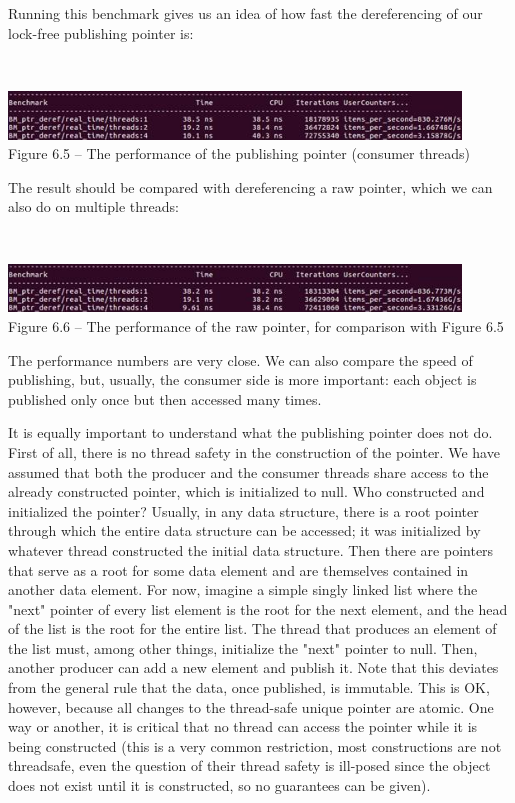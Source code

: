 Running this benchmark gives us an idea of how fast the dereferencing of our lock-free publishing pointer is:

\hspace*{\fill} \\ %
\begin{center}
\includegraphics[width=0.9\textwidth]{content/2/chapter6/images/5.jpg}\\
Figure 6.5 – The performance of the publishing pointer (consumer threads)
\end{center}

The result should be compared with dereferencing a raw pointer, which we can also do on multiple threads:

\hspace*{\fill} \\ %
\begin{center}
\includegraphics[width=0.9\textwidth]{content/2/chapter6/images/6.jpg}\\
Figure 6.6 – The performance of the raw pointer, for comparison with Figure 6.5
\end{center}

The performance numbers are very close. We can also compare the speed of publishing, but, usually, the consumer side is more important: each object is published only once but then accessed many times.

It is equally important to understand what the publishing pointer does not do. First of all, there is no thread safety in the construction of the pointer. We have assumed that both the producer and the consumer threads share access to the already constructed pointer, which is initialized to null. Who constructed and initialized the pointer? Usually, in any data structure, there is a root pointer through which the entire data structure can be accessed; it was initialized by whatever thread constructed the initial data structure. Then there are pointers that serve as a root for some data element and are themselves contained in another data element. For now, imagine a simple singly linked list where the "next" pointer of every list element is the root for the next element, and the head of the list is the root for the entire list. The thread that produces an element of the list must, among other things, initialize the "next" pointer to null. Then, another producer can add a new element and publish it. Note that this deviates from the general rule that the data, once published, is immutable. This is OK, however, because all changes to the thread-safe unique pointer are atomic. One way or another, it is critical that no thread can access the pointer while it is being constructed (this is a very common restriction, most constructions are not threadsafe, even the question of their thread safety is ill-posed since the object does not exist until it is constructed, so no guarantees can be given).

